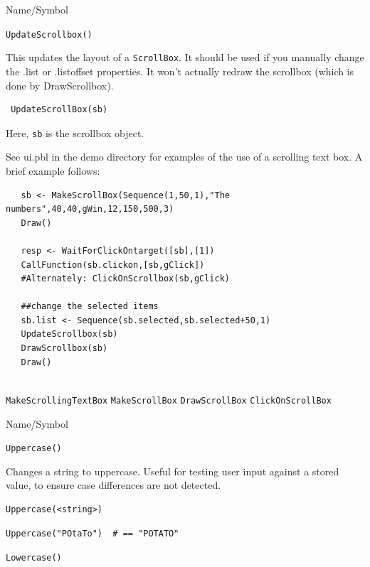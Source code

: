 \begin{desc}{Name/Symbol}
\item[Name/Symbol]  	\verb+UpdateScrollbox()+

\item[Description]	
This updates the layout of a \verb+ScrollBox+. It should be used if you manually change the .list or .listoffset properties.  It won't actually redraw the scrollbox (which is done by DrawScrollbox).

\item[Usage]
\begin{verbatim}
 UpdateScrollBox(sb)
  \end{verbatim}

Here,  \texttt{sb} is the scrollbox object.

\item[Example]      	
See ui.pbl in the demo directory for examples of the use of a scrolling text box.  A brief example follows:

\begin{verbatim}
   sb <- MakeScrollBox(Sequence(1,50,1),"The numbers",40,40,gWin,12,150,500,3)
   Draw()
	  
   resp <- WaitForClickOntarget([sb],[1])
   CallFunction(sb.clickon,[sb,gClick])
   #Alternately: ClickOnScrollbox(sb,gClick) 
 
   ##change the selected items
   sb.list <- Sequence(sb.selected,sb.selected+50,1)
   UpdateScrollbox(sb)      
   DrawScrollbox(sb)
   Draw()
 
\end{verbatim}

\item[See Also]
\verb+MakeScrollingTextBox+
\verb+MakeScrollBox+
\verb+DrawScrollBox+
\verb+ClickOnScrollBox+
\end{desc}



\begin{desc}{Name/Symbol}
\item[Name/Symbol]  	\verb+Uppercase()+

\item[Description]  	Changes a string to uppercase.  Useful for testing user
	      	input against a stored value, to ensure case differences
	      	are not detected.

\item[Usage]
\begin{verbatim}
Uppercase(<string>)
\end{verbatim}

\item[Example]     
\begin{verbatim}
Uppercase("POtaTo")  # == "POTATO"
\end{verbatim}

\item[See Also]     	\verb+Lowercase()+
\end{desc}

